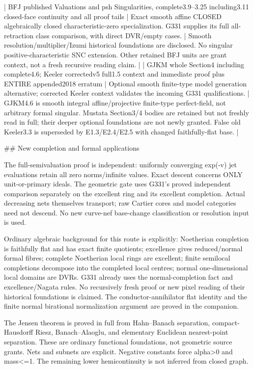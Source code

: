 \documentclass[11pt]{article}
\begin{document}
\begin{QualifiedData}
| BFJ published Valuations and psh Singularities, complete3.9--3.25 including3.11 closed-face continuity and all proof tails | Exact smooth affine CLOSED algebraically closed characteristic-zero specialization. G331 supplies its full all-retraction class comparison, with direct DVR/empty cases. | Smooth resolution/multiplier/Izumi historical foundations are disclosed. No singular positive-characteristic SNC extension. Other retained BFJ units are grant context, not a fresh recursive reading claim. |
| GJKM whole Section4 including complete4.6; Keeler correctedv5 full1.5 context and immediate proof plus ENTIRE appended2018 erratum | Optional smooth finite-type model generation alternative; corrected Keeler context validates the incoming G331 qualifications. | GJKM4.6 is smooth integral affine/projective finite-type perfect-field, not arbitrary formal singular. Mustata Section3/4 bodies are retained but not freshly read in full; their deeper optional foundations are not newly granted. False old Keeler3.3 is superseded by E1.3/E2.4/E2.5 with changed faithfully-flat base. |

## New completion and formal applications

The full-semivaluation proof is independent: uniformly converging exp(-v) jet evaluations retain all zero norms/infinite values. Exact descent concerns ONLY unit-or-primary ideals. The geometric gate uses G331's proved independent comparison separately on the excellent ring and its excellent completion. Actual decreasing nets themselves transport; raw Cartier cores and model categories need not descend. No new curve-nef base-change classification or resolution input is used.

Ordinary algebraic background for this route is explicitly: Noetherian completion is faithfully flat and has exact finite quotients; excellence gives reduced/normal formal fibres; complete Noetherian local rings are excellent; finite semilocal completions decompose into the completed local centres; normal one-dimensional local domains are DVRs. G331 already uses the normal-completion fact and excellence/Nagata rules. No recursively fresh proof or new pixel reading of their historical foundations is claimed. The conductor-annihilator flat identity and the finite normal birational normalization argument are proved in the companion.

The Jensen theorem is proved in full from Hahn--Banach separation, compact-Hausdorff Riesz, Banach--Alaoglu, and elementary Euclidean nearest-point separation. These are ordinary functional foundations, not geometric source grants. Nets and subnets are explicit. Negative constants force alpha>0 and mass<=1. The remaining lower hemicontinuity is not inferred from closed graph.


\end{QualifiedData}
\end{document}
